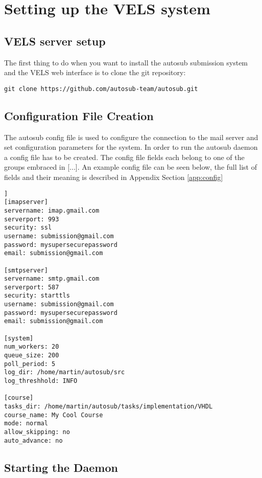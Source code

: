\section{Setting up the VELS system} \label{system_setup}

\subsection{VELS server setup} \label{sub:serversetup}

The first thing to do when you want to install the autosub submission system and the VELS
web interface is to clone the git repository:

\begin{verbatim}
git clone https://github.com/autosub-team/autosub.git
\end{verbatim}

\subsection{Configuration File Creation} \label{sub:exampleconfig}
The autosub config file is used to configure the connection to the mail server and set
configuration parameters for the system. In order to run the autosub daemon a config file
has to be created. The config file fields each belong to one of the groups embraced 
in [...]. An example config file can be seen below, the full list of fields and their
meaning is described in Appendix 
Section \ref{app:config}

\begin{lstlisting}[frame=single,captionpos=b,caption=example.cfg, belowcaptionskip=4pt]]
[imapserver]
servername: imap.gmail.com
serverport: 993
security: ssl
username: submission@gmail.com
password: mysupersecurepassword
email: submission@gmail.com

[smtpserver]
servername: smtp.gmail.com
serverport: 587
security: starttls
username: submission@gmail.com
password: mysupersecurepassword
email: submission@gmail.com

[system]
num_workers: 20
queue_size: 200
poll_period: 5
log_dir: /home/martin/autosub/src
log_threshhold: INFO

[course]
tasks_dir: /home/martin/autosub/tasks/implementation/VHDL
course_name: My Cool Course
mode: normal
allow_skipping: no
auto_advance: no
\end{lstlisting}

\subsection{Starting the Daemon}

